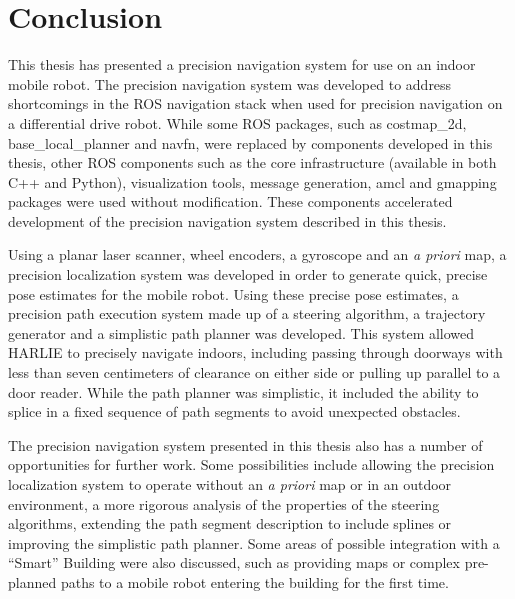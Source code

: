 \section{Conclusion}\label{sec:conclusion}

This thesis has presented a precision navigation system for use on an indoor mobile robot. The precision navigation system was developed to address shortcomings in the ROS navigation stack when used for precision navigation on a differential drive robot. While some ROS packages, such as costmap\_2d, base\_local\_planner and navfn, were replaced by components developed in this thesis, other ROS components such as the core infrastructure (available in both C++ and Python), visualization tools, message generation, amcl and gmapping packages were used without modification. These components accelerated development of the precision navigation system described in this thesis.

Using a planar laser scanner, wheel encoders, a gyroscope and an \emph{a priori} map, a precision localization system was developed in order to generate quick, precise pose estimates for the mobile robot. Using these precise pose estimates, a precision path execution system made up of a steering algorithm, a trajectory generator and a simplistic path planner was developed. This system allowed HARLIE to precisely navigate indoors, including passing through doorways with less than seven centimeters of clearance on either side or pulling up parallel to a door reader. While the path planner was simplistic, it included the ability to splice in a fixed sequence of path segments to avoid unexpected obstacles.

The precision navigation system presented in this thesis also has a number of opportunities for further work. Some possibilities include allowing the precision localization system to operate without an \emph{a priori} map or in an outdoor environment, a more rigorous analysis of the properties of the steering algorithms, extending the path segment description to include splines or improving the simplistic path planner. Some areas of possible integration with a ``Smart'' Building were also discussed, such as providing maps or complex pre-planned paths to a mobile robot entering the building for the first time.